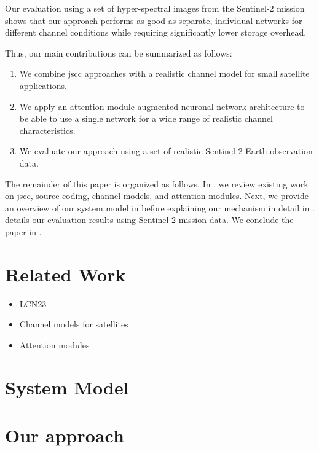 \documentclass[conference]{IEEEtran}
\newcommand\sentinelii{Sentinel-2\xspace}
\begin{document}
Our evaluation using a set of hyper-spectral images from the \sentinelii mission shows that our approach performs as good as separate, individual networks for different channel conditions while requiring significantly lower storage overhead.

Thus, our main contributions can be summarized as follows:
%
\begin{enumerate}
  \item We combine \ac{jscc} approaches with a realistic channel model for small satellite applications.
  \item We apply an attention-module-augmented neuronal network architecture to be able to use a single network for a wide range of realistic channel characteristics.
  \item We evaluate our approach using a set of realistic \sentinelii Earth observation data.
\end{enumerate}

The remainder of this paper is organized as follows.
In , we review existing work on \ac{jscc}, source coding, channel models, and attention modules.
Next, we provide an overview of our system model in  before explaining our mechanism in detail in .
 details our evaluation results using \sentinelii mission data.
We conclude the paper in .

\section{Related Work}
\label{sec:related_work}

\begin{itemize}
  \item LCN23
  \item Channel models for satellites
  \item Attention modules
\end{itemize}



\section{System Model}
\label{sec:system_model}

\section{Our approach}
\label{sec:our_approach}
\end{document}
